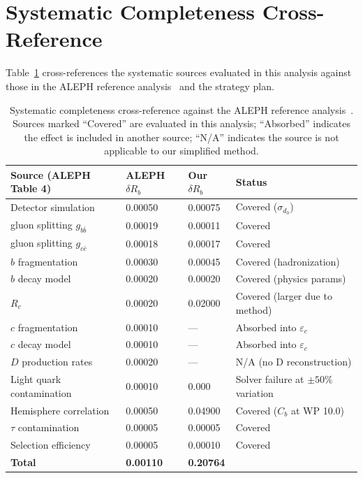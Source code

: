 \documentclass[11pt,a4paper]{article}
\begin{document}
\section{Systematic Completeness Cross-Reference}
\label{app:syst_completeness}

Table~\ref{tab:syst_completeness} cross-references the systematic sources evaluated
in this analysis against those in the ALEPH reference analysis~\cite{ALEPH:Rb:1996}
and the strategy plan.

\begin{table}[htbp]
\centering
\caption{Systematic completeness cross-reference against the ALEPH reference
analysis~\cite{ALEPH:Rb:1996}. Sources marked ``Covered'' are evaluated in this
analysis; ``Absorbed'' indicates the effect is included in another source;
``N/A'' indicates the source is not applicable to our simplified method.}
\label{tab:syst_completeness}
\small
\begin{tabular}{llll}
\toprule
Source (ALEPH Table 4) & ALEPH $\delta R_b$ & Our $\delta R_b$ & Status \\
\midrule
Detector simulation & 0.00050 & 0.00075 & Covered ($\sigma_{d_0}$) \\
gluon splitting $g_{b\bar{b}}$ & 0.00019 & 0.00011 & Covered \\
gluon splitting $g_{c\bar{c}}$ & 0.00018 & 0.00017 & Covered \\
$b$ fragmentation & 0.00030 & 0.00045 & Covered (hadronization) \\
$b$ decay model & 0.00020 & 0.00020 & Covered (physics params) \\
$R_c$ & 0.00020 & 0.02000 & Covered (larger due to method) \\
$c$ fragmentation & 0.00010 & --- & Absorbed into $\varepsilon_c$ \\
$c$ decay model & 0.00010 & --- & Absorbed into $\varepsilon_c$ \\
$D$ production rates & 0.00020 & --- & N/A (no D reconstruction) \\
Light quark contamination & 0.00010 & 0.000 & Solver failure at $\pm 50\%$ variation \\
Hemisphere correlation & 0.00050 & 0.04900 & Covered ($C_b$ at WP 10.0) \\
$\tau$ contamination & 0.00005 & 0.00005 & Covered \\
Selection efficiency & 0.00005 & 0.00010 & Covered \\
\midrule
\textbf{Total} & \textbf{0.00110} & \textbf{0.20764} & \\
\bottomrule
\end{tabular}
\end{table}
\end{document}
